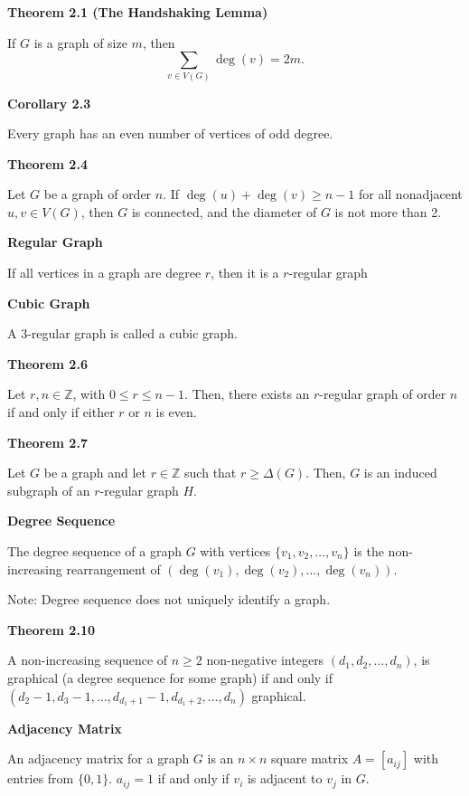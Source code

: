 \documentclass{article}
\begin{document}
\medskip\noindent\textbf{Theorem 2.1 (The Handshaking Lemma)}

    If $G$ is a graph of size $m$, then $$\sum_{v \in V(G)} \deg(v) = 2m.$$

\medskip\noindent\textbf{Corollary 2.3}

    Every graph has an even number of vertices of odd degree.

\medskip\noindent\textbf{Theorem 2.4}

    Let $G$ be a graph of order $n$. If $\deg(u) + \deg(v) \geq n-1$ for all nonadjacent $u,v \in V(G)$, then $G$ is connected, and the diameter of $G$ is not more than 2.

\medskip\noindent\textbf{}

\medskip\noindent\textbf{Regular Graph}

    If all vertices in a graph are degree $r$, then it is a $r$-regular graph

\medskip\noindent\textbf{Cubic Graph}

    A 3-regular graph is called a cubic graph.

\medskip\noindent\textbf{Theorem 2.6}

    Let $r, n \in \mathbb Z$, with $0 \leq r \leq n-1$. Then, there exists an $r$-regular graph of order $n$ if and only if either $r$ or $n$ is even.

\medskip\noindent\textbf{Theorem 2.7}

    Let $G$ be a graph and let $r \in \mathbb Z$ such that $r \geq \Delta(G)$. Then, $G$ is an induced subgraph of an $r$-regular graph $H$.

\medskip\noindent\textbf{Degree Sequence}

    The degree sequence of a graph $G$ with vertices $\{v_1, v_2, \hdots, v_n\}$ is the non-increasing rearrangement of $(\deg(v_1), \deg(v_2), \hdots, \deg(v_n))$.

    Note: Degree sequence does not uniquely identify a graph.

\medskip\noindent\textbf{Theorem 2.10}

    A non-increasing sequence of $n \geq 2$ non-negative integers $(d_1, d_2, \hdots, d_n)$, is graphical (a degree sequence for some graph) if and only if $(d_2-1, d_3-1, \hdots, d_{d_1+1}-1, d_{d_1+2}, \hdots, d_n)$ graphical.

\medskip\noindent\textbf{Adjacency Matrix}

    An adjacency matrix for a graph $G$ is an $n \times n$ square matrix $A = [a_{ij}]$ with entries from $\{0, 1\}$.
    $a_{ij} = 1$ if and only if $v_i$ is adjacent to $v_j$ in $G$.
\end{document}
